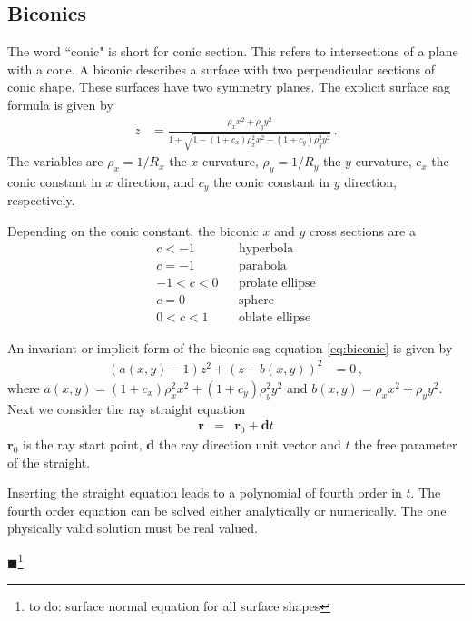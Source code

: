 \documentclass[12pt,a4paper,twoside,openright,BCOR10mm,headsepline,titlepage,abstracton,chapterprefix,final]{scrreprt}
\newcommand\Vector[1]{{\mathbf{#1}}}
\newcommand\Location{\Vector{r}}
\newcommand{\remark}[1]{{\color{red}$\blacksquare$}\footnote{{\color{red}#1}}}
\begin{document}
\subsection{Biconics}
The word ``conic" is short for conic section. 
This refers to intersections of a plane with a cone.
A biconic describes a surface with two perpendicular sections of conic shape. 
These surfaces have two symmetry planes.
The explicit surface sag formula is given by
\begin{align}
 z &= \frac{\rho_x x^2 + \rho_y y^2}{1 + \sqrt{1 - (1+c_x) \rho_x^2 x^2 - (1+c_y) \rho_y^2 y^2}} \label{eq:biconic}\,.
\end{align}
The variables are $\rho_x = 1/R_x$ the $x$ curvature, $\rho_y = 1/R_y$ the $y$ curvature, $c_x$ the conic constant in $x$ direction,
and $c_y$ the conic constant in $y$ direction, respectively. 

Depending on the conic constant, the biconic $x$ and $y$ cross sections are a
\begin{eqnarray*}
     c < -1 && \textrm{hyperbola} \\
     c = -1 && \textrm{parabola} \\
-1 < c < 0 && \textrm{prolate ellipse} \\
     c = 0 && \textrm{sphere} \\
 0 < c < 1 && \textrm{oblate ellipse}
\end{eqnarray*}


An invariant or implicit form of the biconic sag equation \eqref{eq:biconic} is given by
\begin{align}
 (a(x,y) - 1) z^2 + (z - b(x,y))^2 &= 0\,,\label{eq:implicitbiconic}
 \label{eq:biconicImplicitSag}
\end{align}
where $a(x,y) = (1 + c_x) \rho_x^2 x^2 + (1 + c_y) \rho_y^2 y^2$ and $b(x,y) = \rho_x x^2 + \rho_y y^2$. 
Next we consider the ray straight equation
\begin{eqnarray}
 \Location &=& \Location_0 + \Vector{d} t \label{eq:ray}
\end{eqnarray}
$\Location_0$ is the ray start point, $\Vector{d}$ the ray direction unit vector and $t$ the free parameter of the straight.

Inserting the straight equation leads to a polynomial of fourth order in $t$.
The fourth order equation can be solved either analytically or numerically.
The one physically valid solution must be real valued.

\remark{to do: surface normal equation for all surface shapes}
\end{document}

